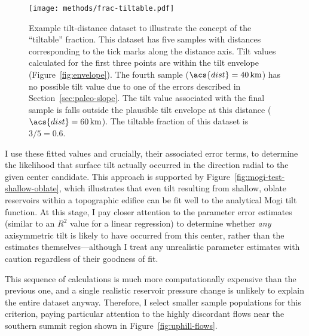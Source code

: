 \begin{figure}
    \texttt{[image: methods/frac-tiltable.pdf]}%
    \caption[``Tiltable'' fraction]{Example tilt-distance dataset to illustrate the concept of the ``tiltable'' fraction. This dataset has five samples with distances corresponding to the tick marks along the distance axis. Tilt values calculated for the first three points are within the tilt envelope (Figure~\ref{fig:envelope}). The fourth sample ($\acs{dist} = \qty{40}{\km}$) has no possible tilt value due to one of the errors described in Section~\ref{sec:paleo-slope}. The tilt value associated with the final sample is falls outside the plausible tilt envelope at this distance ($\acs{dist} = \qty{60}{\km}$). The tiltable fraction of this dataset is $3/5 = 0.6$.}%
    \label{fig:frac-tiltable}
\end{figure}

I use these fitted values and crucially, their associated error terms, to determine the likelihood that surface tilt actually occurred in the direction radial to the given center candidate. This approach is supported by Figure~\ref{fig:mogi-test-shallow-oblate}, which illustrates that even tilt resulting from shallow, oblate reservoirs within a topographic edifice can be fit well to the analytical Mogi tilt function. At this stage, I pay closer attention to the parameter error estimates (similar to an $R^2$ value for a linear regression) to determine whether \emph{any} axisymmetric tilt is likely to have occurred from this center, rather than the estimates themselves---although I treat any unrealistic parameter estimates with caution regardless of their goodness of fit.

This sequence of calculations is much more computationally expensive than the previous one, and a single realistic reservoir pressure change is unlikely to explain the entire dataset anyway. Therefore, I select smaller sample populations for this criterion, paying particular attention to the highly discordant flows near the southern summit region shown in Figure~\ref{fig:uphill-flows}.



